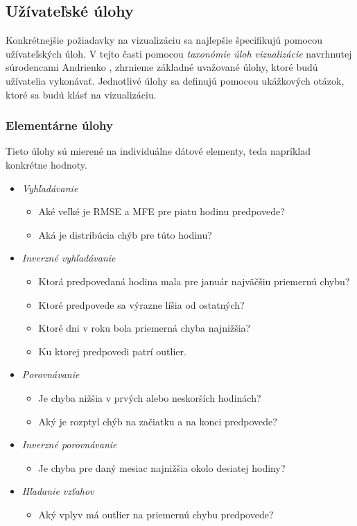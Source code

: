 \subsection{Užívateľské úlohy}
Konkrétnejšie požiadavky na vizualizáciu sa najlepšie špecifikujú pomocou užívateľských úloh. V tejto časti pomocou \textit{taxonómie úloh vizualizácie} navrhnutej súrodencami Andrienko \cite{Andrienko}, zhrnieme základné uvažované úlohy, ktoré budú užívatelia vykonávať. Jednotlivé úlohy sa definujú pomocou ukážkových otázok, ktoré sa budú klásť na vizualizáciu.
\subsubsection{Elementárne úlohy}
Tieto úlohy sú mierené na individuálne dátové elementy, teda napríklad konkrétne hodnoty.
\begin{itemize}[noitemsep]
	\item \textit{Vyhľadávanie}
	\begin{itemize}
		\item Aké veľké je RMSE a MFE pre piatu hodinu predpovede?
		\item Aká je distribúcia chýb pre túto hodinu?	 
	\end{itemize}
	\item \textit{Inverzné vyhľadávanie} 
	\begin{itemize}
		\item Ktorá predpovedaná hodina mala pre január najväčšiu priemernú chybu? 
		\item Ktoré predpovede sa výrazne líšia od ostatných? 
		\item Ktoré dni v roku bola priemerná chyba najnižšia?
		\item Ku ktorej predpovedi patrí outlier.
	\end{itemize}
	\item \textit{Porovnávanie}
	\begin{itemize}
		\item Je chyba nižšia v prvých alebo neskorších hodinách?
		\item Aký je rozptyl chýb na začiatku a na konci predpovede?
	\end{itemize}
	\item \textit{Inverzné porovnávanie}
	\begin{itemize}
		\item Je chyba pre daný mesiac najnižšia okolo desiatej hodiny?
	\end{itemize}
	\item \textit{Hľadanie vzťahov}
	\begin{itemize}
		\item Aký vplyv má outlier na priemernú chybu predpovede?
	\end{itemize}
\end{itemize}

